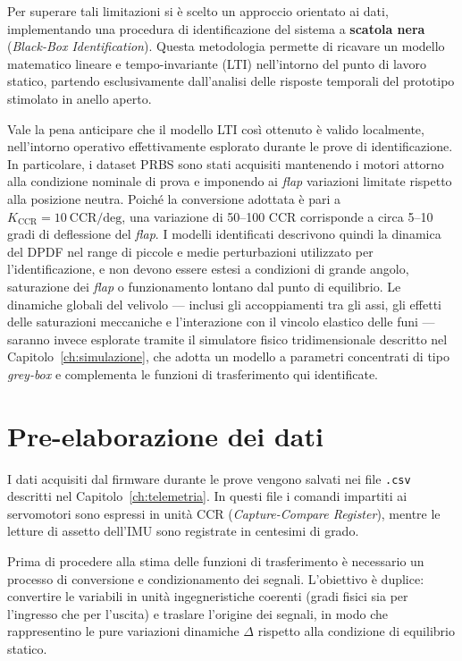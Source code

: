 \documentclass[11pt]{report}
\begin{document}
Per superare tali limitazioni si è scelto un approccio orientato ai dati, implementando una procedura di identificazione del sistema a \textbf{scatola nera} (\textit{Black-Box Identification}). Questa metodologia permette di ricavare un modello matematico lineare e tempo-invariante (LTI) nell'intorno del punto di lavoro statico, partendo esclusivamente dall'analisi delle risposte temporali del prototipo stimolato in anello aperto.

Vale la pena anticipare che il modello LTI così ottenuto è valido localmente,
nell'intorno operativo effettivamente esplorato durante le prove di identificazione.
In particolare, i dataset PRBS sono stati acquisiti mantenendo i motori attorno alla
condizione nominale di prova e imponendo ai \textit{flap} variazioni limitate rispetto
alla posizione neutra. Poiché la conversione adottata è pari a
\(K_\text{CCR}=10~\mathrm{CCR/deg}\), una variazione di 50--100 CCR corrisponde
a circa 5--10 gradi di deflessione del \textit{flap}. I modelli identificati descrivono
quindi la dinamica del DPDF nel range di piccole e medie perturbazioni utilizzato
per l'identificazione, e non devono essere estesi a condizioni di grande angolo,
saturazione dei \textit{flap} o funzionamento lontano dal punto di equilibrio. Le dinamiche globali del velivolo --- inclusi gli accoppiamenti tra gli assi, gli effetti delle saturazioni meccaniche e l'interazione con il vincolo elastico delle funi --- saranno invece esplorate tramite il simulatore fisico tridimensionale descritto nel Capitolo~\ref{ch:simulazione}, che adotta un modello a parametri concentrati di tipo \textit{grey-box} e complementa le funzioni di trasferimento qui identificate.

\section{Pre-elaborazione dei dati}
\label{sec:pre_elaborazione}

I dati acquisiti dal firmware durante le prove vengono salvati nei file \texttt{.csv} descritti nel Capitolo~\ref{ch:telemetria}. In questi file i comandi impartiti ai servomotori sono espressi in unità CCR (\textit{Capture-Compare Register}), mentre le letture di assetto dell'IMU sono registrate in centesimi di grado.

Prima di procedere alla stima delle funzioni di trasferimento è necessario un processo di conversione e condizionamento dei segnali. L'obiettivo è duplice: convertire le variabili in unità ingegneristiche coerenti (gradi fisici sia per l'ingresso che per l'uscita) e traslare l'origine dei segnali, in modo che rappresentino le pure variazioni dinamiche $\Delta$ rispetto alla condizione di equilibrio statico.
\end{document}
